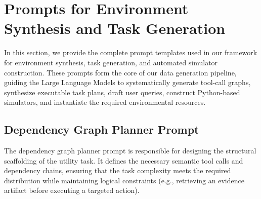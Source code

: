 
\section{Prompts for Environment Synthesis and Task Generation}
\label{app:prompts_env}

In this section, we provide the complete prompt templates used in our framework for environment synthesis, task generation, and automated simulator construction. These prompts form the core of our data generation pipeline, guiding the Large Language Models to systematically generate tool-call graphs, synthesize executable task plans, draft user queries, construct Python-based simulators, and instantiate the required environmental resources.

\subsection{Dependency Graph Planner Prompt}
\label{app:prompts:graph_planner}
The dependency graph planner prompt is responsible for designing the structural scaffolding of the utility task. It defines the necessary semantic tool calls and dependency chains, ensuring that the task complexity meets the required distribution while maintaining logical constraints (e.g., retrieving an evidence artifact before executing a targeted action).


